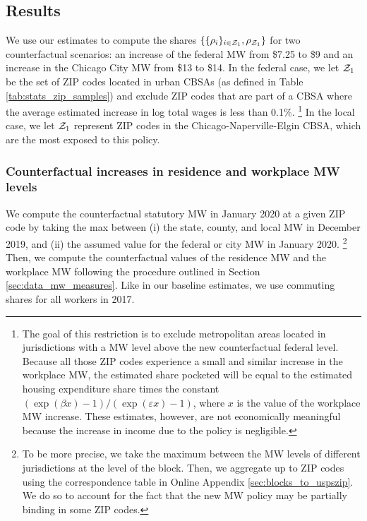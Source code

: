 \subsection{Results}\label{sec:results_cf}

We use our estimates to compute the shares 
$\{\{\rho_i\}_{i\in\mathcal{Z}_1},\rho_{\mathcal{Z}_1}\}$ for two counterfactual scenarios:
an increase of the federal MW from \$7.25 to \$9 and 
an increase in the Chicago City MW from \$13 to \$14.
In the federal case, we let $\mathcal{Z}_1$ be the set of ZIP codes located in urban 
CBSAs (as defined in Table \ref{tab:stats_zip_samples}) and exclude ZIP codes 
that are part of a CBSA where the average estimated increase in log total wages 
is less than 0.1\%.%
\footnote{\label{foot:restriction_on_zipcodes}
The goal of this restriction is to exclude metropolitan areas located 
in jurisdictions with a MW level above the new counterfactual federal level.
Because all those ZIP codes experience a small and similar increase in the 
workplace MW, the estimated share pocketed will be equal to the estimated
housing expenditure share times the constant 
$\left(\exp(\beta x)-1\right)/\left(\exp(\varepsilon x)-1\right)$,
where $x$ is the value of the workplace MW increase.
These estimates, however, are not economically meaningful because the increase
in income due to the policy is negligible.}
In the local case, we let $\mathcal{Z}_1$ represent ZIP codes in the 
Chicago-Naperville-Elgin CBSA, which are the most exposed to this policy.

\subsubsection{Counterfactual increases in residence and workplace MW levels}
\label{sec:cf_res_and_wkp_changes}

We compute the counterfactual statutory MW in January 2020 at a given ZIP code 
by taking the max between (i) the state, county, and local MW in December 2019, 
and (ii) the assumed value for the federal or city MW in January 2020.%
\footnote{To be more precise, we take the maximum between the MW levels of 
different jurisdictions at the level of the block.
Then, we aggregate up to ZIP codes using the correspondence table in 
Online Appendix \ref{sec:blocks_to_uspszip}.
We do so to account for the fact that the new MW policy may be partially 
binding in some ZIP codes.}
Then, we compute the counterfactual values of the residence MW and the workplace
MW following the procedure outlined in Section \ref{sec:data_mw_measures}.
Like in our baseline estimates, we use commuting shares for all workers in 2017.

